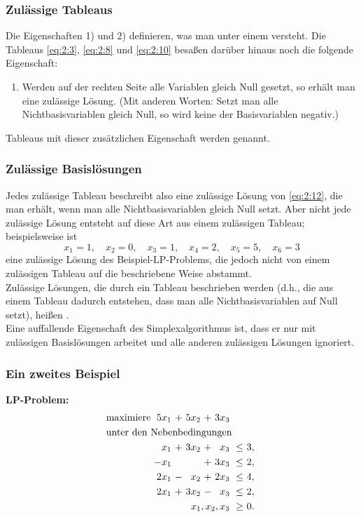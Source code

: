 \documentclass[smaller]{beamer}
\begin{document}
\begin{frame}
 \frametitle{Zulässige Tableaus}
 Die Eigenschaften 1) und 2) definieren, was man unter einem  versteht. Die Tableaus \eqref{eq:2:3}, \eqref{eq:2:8} und \eqref{eq:2:10} besaßen darüber hinaus noch die folgende Eigenschaft:
\begin{enumerate}[3)]
\addtocounter{enumi}{2}
\item  Werden auf der rechten Seite alle Variablen gleich Null gesetzt, so erhält man eine zulässige Lösung. (Mit anderen Worten: Setzt man alle Nichtbasisvariablen gleich Null, so wird keine der Basisvariablen negativ.)
\end{enumerate}

Tableaus mit dieser zusätzlichen Eigenschaft werden  genannt.
\end{frame}

\begin{frame}
 \frametitle{Zulässige Basislösungen}
 \alert{Jedes zulässige Tableau beschreibt also eine zulässige Lösung von \eqref{eq:2:12}, die man erhält, wenn man alle Nichtbasisvariablen gleich Null setzt}. Aber nicht jede zulässige Lösung entsteht auf diese Art aus einem zulässigen Tableau; beispielsweise ist
\[
x_1=1,\quad x_2=0,\quad x_3=1,\quad x_4=2,\quad x_5=5,\quad x_6=3
\]
eine zulässige Lösung des Beispiel-LP-Problems, die jedoch nicht von einem zulässigen Tableau auf die beschriebene Weise abstammt.\\
\vspace*{0.2cm}
Zulässige Lösungen, die durch ein Tableau beschrieben werden (d.h., die aus einem Tableau dadurch entstehen, dass man alle Nichtbasisvariablen auf Null setzt), heißen .\\
\vspace*{.2cm}
\alert{Eine auffallende Eigenschaft des Simplexalgorithmus ist, dass er nur mit zulässigen Basislösungen arbeitet und alle anderen zulässigen Lösungen ignoriert}.
\end{frame}

\begin{frame}
 \frametitle{Ein zweites Beispiel}
 \textbf{LP-Problem:}
\begin{align*}
\begin{alignedat}{5}
& \text{maximiere } & 5x_1 &\ + &\ 5x_2 &\ + &\ 3x_3 & & \\
& \rlap{unter den Nebenbedingungen} & & & & & & & \\
&&  x_1 &\ + &\ 3x_2 &\ + &\  x_3 &\ \leq &\ 3,\ \\
&& -x_1 &\   &\      &\ + &\ 3x_3 &\ \leq &\ 2,\ \\
&& 2x_1 &\ - &\  x_2 &\ + &\ 2x_3 &\ \leq &\ 4,\ \\
&& 2x_1 &\ + &\ 3x_2 &\ - &\  x_3 &\ \leq &\ 2,\ \\
&& & & & & \llap{$x_1, x_2, x_3$} &\ \geq &\ 0.\
\end{alignedat}
\end{align*}
\end{frame}
\end{document}
